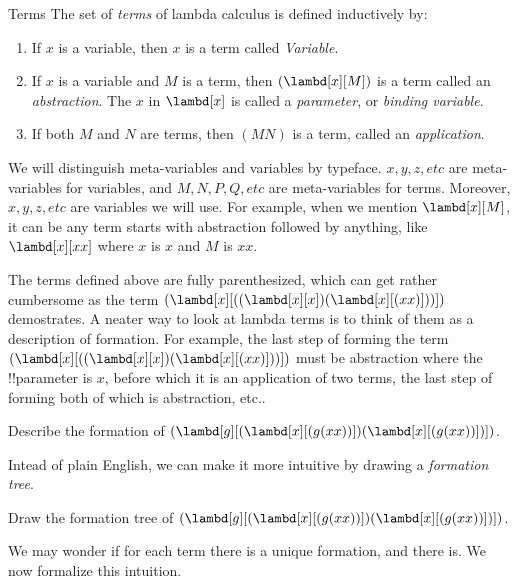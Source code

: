 \documentclass[../../../include/open-logic-section]{subfiles}
\begin{document}

\begin{defn}{Terms} 
The set of \emph{terms} of lambda calculus is defined inductively by:
\begin{enumerate}
  \item {} If $x$ is a variable, then $x$ is a
    term called \emph{Variable}.
  \item {} If $x$ is a variable and $M$ is a term, then $(\lambd[x][M])$ is
    a term called an \emph{abstraction}. The $x$ in
    $\lambd[x]$ is called a \emph{parameter}, or \emph{binding variable}.
  \item {} If both $M$ and $N$ are terms, then
    $(MN)$ is a term, called an \emph{application}.
\end{enumerate}
\end{defn}

We will distinguish meta-variables and variables by typeface. $x, y,
z, etc$ are meta-variables for variables, and $M, N, P, Q, etc$ are
meta-variables for terms. Moreover,  $x, y, z, etc$ are variables
we will use. For example, when we mention $\lambd[x][M]$, it can be
any term starts with abstraction followed by anything, like
$\lambd[x][x x]$ where $x$ is $x$ and $M$ is $x x$.


The terms defined above are fully parenthesized, which can get rather
cumbersome as the term $(\lambd[x][((\lambd[x][x])(\lambd[x][(xx)]))])$ demostrates. A neater way to look at lambda terms is to think of them as
a description of formation. For
example, the last step of forming the term $(\lambd[x][((\lambd[x][x])(\lambd[x][(xx)]))])$
must be abstraction where the !!{parameter} is $x$, before which it is
an application of two terms, the last step of forming both of which is
abstraction, etc.. 

\begin{prob}
  Describe the formation of $(\lambd[g][(\lambd[x][(g (x x))]) (\lambd[x][(g (x x))])])$.
\end{prob}

Intead of plain English, we can make it more intuitive by drawing a
\emph{formation tree}.

\begin{prob}
  Draw the formation tree of $(\lambd[g][(\lambd[x][(g (x x))]) (\lambd[x][(g (x x))])])$.
\end{prob}

We may wonder if for each term there is a unique formation, and there
is. We now formalize this intuition.
\end{document}
